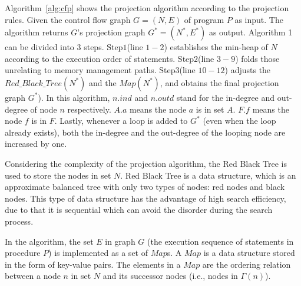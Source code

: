 Algorithm~\ref{alg:cfp} shows the projection algorithm according to the projection rules. %
%
Given the control flow graph $G = (N, E)$ of program $P$ as input. The algorithm returns $G$'s projection graph $G^*= (N^*, E^*)$ as output. Algorithm 1 can be divided into $3$ steps. Step$1$(line $1-2$) establishes the min-heap of $N$ according to the execution order of statements. Step$2$(line $3-9$) folds those unrelating to memory management paths. Step$3$(line $10-12$) adjusts the $\mathit{Red\_Black\_Tree}(N^*)$ and the $\mathit{Map}(N^*)$, and obtains the final projection graph $G^*$).
In this algorithm, $n.ind$ and $n.outd$ stand for the in-degree and out-degree of node $n$ respectively. $A.a$ means the node $a$ is in set $A$. $F.f$ means the node $f$ is in $F$. Lastly, whenever a loop is added to $G^*$ (even when the loop already exists), both the in-degree and the out-degree of the looping node are increased by one.

Considering the complexity of the projection algorithm, the Red Black Tree is used to store the nodes in set $N$. Red Black Tree is a data structure, which is an approximate balanced tree with only two types of nodes: red nodes and black nodes. This type of data structure has the advantage of high search efficiency, due to that it is sequential which can avoid the disorder during the search process. 

In the algorithm, the set $E$ in graph $G$ (the execution sequence of statements in procedure $P$) is implemented as a set of $Map$s. A $Map$ is a data structure stored in the form of key-value pairs. The elements in a $Map$ are the ordering relation between a node $n$ in set $N$ and its successor nodes (i.e., nodes in $\Gamma(n)$).

